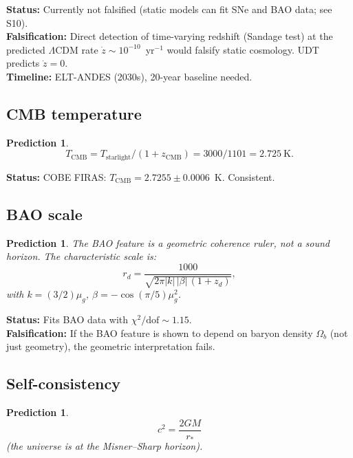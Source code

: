 \documentclass[11pt,letterpaper]{article}
\newtheorem{prediction}[theorem]{Prediction}
\numberwithin{equation}{section}
\begin{document}
\noindent\textbf{Status:} Currently not falsified (static models can fit
SNe and BAO data; see S10).\\
\textbf{Falsification:} Direct detection of time-varying redshift (Sandage
test) at the predicted $\Lambda$CDM rate $\dot{z} \sim 10^{-10}$~yr$^{-1}$
would falsify static cosmology. UDT predicts $\dot{z} = 0$.\\
\textbf{Timeline:} ELT-ANDES (2030s), 20-year baseline needed.

\subsection{CMB temperature}

\begin{prediction}
\begin{equation}
  T_\mathrm{CMB} = T_\mathrm{starlight}/(1 + z_\mathrm{CMB})
  = 3000/1101 = 2.725~\mathrm{K}.
\end{equation}
\end{prediction}

\noindent\textbf{Status:} COBE FIRAS: $T_\mathrm{CMB} = 2.7255 \pm 0.0006$~K.
Consistent.

\subsection{BAO scale}

\begin{prediction}
The BAO feature is a geometric coherence ruler, not a sound horizon.
The characteristic scale is:
\begin{equation}
  r_d = \frac{1000}{\sqrt{2\pi|k|\,|\beta|\,(1+z_d)}},
\end{equation}
with $k = (3/2)\mu_g$, $\beta = -\cos(\pi/5)\mu_g^2$.
\end{prediction}

\noindent\textbf{Status:} Fits BAO data with $\chi^2/\mathrm{dof} \sim 1.15$.\\
\textbf{Falsification:} If the BAO feature is shown to depend on baryon
density $\Omega_b$ (not just geometry), the geometric interpretation fails.

\subsection{Self-consistency}

\begin{prediction}
\begin{equation}
  c^2 = \frac{2GM}{r_*}
\end{equation}
(the universe is at the Misner--Sharp horizon).
\end{prediction}
\end{document}
